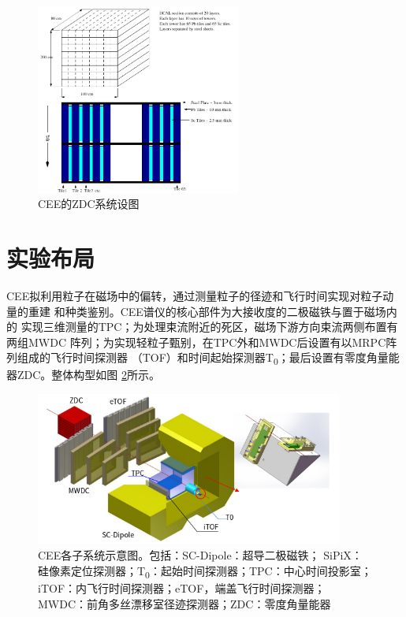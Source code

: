 \documentclass[bachelor,openany,oneside,color]{buaathesis}
\def\TZ{T\textsubscript{0}}
\begin{document}
\begin{figure}
	\centering
	\includegraphics[width=0.6\textwidth]{./resource/CEE-ZDC.png}
	\caption{CEE的ZDC系统设图\cite{技术文档}}
	\label{fig:det:ZDC}
\end{figure}

\section{实验布局}

CEE拟利用粒子在磁场中的偏转，通过测量粒子的径迹和飞行时间实现对粒子动量的重建
和种类鉴别。\cite{技术文档,Lyu:ConceptDesign}CEE谱仪的核心部件为大接收度的二极磁铁与置于磁场内的
实现三维测量的TPC；为处理束流附近的死区，磁场下游方向束流两侧布置有两组MWDC
阵列；为实现轻粒子甄别，在TPC外和MWDC后设置有以MRPC阵列组成的飞行时间探测器
（TOF）和时间起始探测器\TZ；最后设置有零度角量能器ZDC。整体构型如图
\ref{fig:CEE:Subsystem}所示。

\begin{figure}\centering
	\includegraphics[width=0.9\textwidth]{./resource/CEE-Subsystem.png}
	\captionsetup{width=0.9\textwidth}
	\caption{CEE各子系统示意图。包括：SC-Dipole：超导二极磁铁；
		SiPiX：硅像素定位探测器；\TZ：起始时间探测器；TPC：中心时间投影室；
		iTOF：内飞行时间探测器；eTOF，端盖飞行时间探测器；
		MWDC：前角多丝漂移室径迹探测器；ZDC：零度角量能器
		\cite{技术文档,Lyu:ConceptDesign}}
	\label{fig:CEE:Subsystem}
\end{figure}
\end{document}

